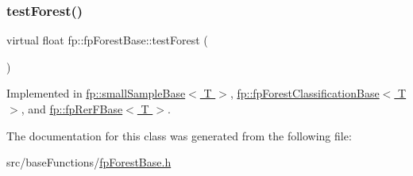 \subsubsection{\texorpdfstring{test\+Forest()}{testForest()}}
{\footnotesize\ttfamily virtual float fp\+::fp\+Forest\+Base\+::test\+Forest (\begin{DoxyParamCaption}{ }\end{DoxyParamCaption})\hspace{0.3cm}{\ttfamily [pure virtual]}}



Implemented in \hyperlink{classfp_1_1smallSampleBase_a02b01949b6ed9cc6644b045a468609cc}{fp\+::small\+Sample\+Base$<$ T $>$}, \hyperlink{classfp_1_1fpForestClassificationBase_a3f1ad5a5cfb3633713d0a81bd1c356e8}{fp\+::fp\+Forest\+Classification\+Base$<$ T $>$}, and \hyperlink{classfp_1_1fpRerFBase_a0ea48ea24a8213e49e18b6f24ab45508}{fp\+::fp\+Rer\+F\+Base$<$ T $>$}.



The documentation for this class was generated from the following file\+:\begin{DoxyCompactItemize}
\item 
src/base\+Functions/\hyperlink{fpForestBase_8h}{fp\+Forest\+Base.\+h}\end{DoxyCompactItemize}
